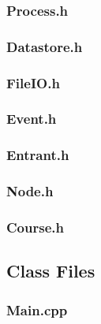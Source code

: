 \documentclass[a4paper, 10pt]{article}
\begin{document}
\clearpage
\subsubsection{Process.h}


\clearpage
\subsubsection{Datastore.h}


\clearpage
\subsubsection{FileIO.h}


\clearpage
\subsubsection{Event.h}


\clearpage
\subsubsection{Entrant.h}


\clearpage
\subsubsection{Node.h}


\clearpage
\subsubsection{Course.h}


\clearpage
\subsection{Class Files}

\subsubsection{Main.cpp}

\end{document}
